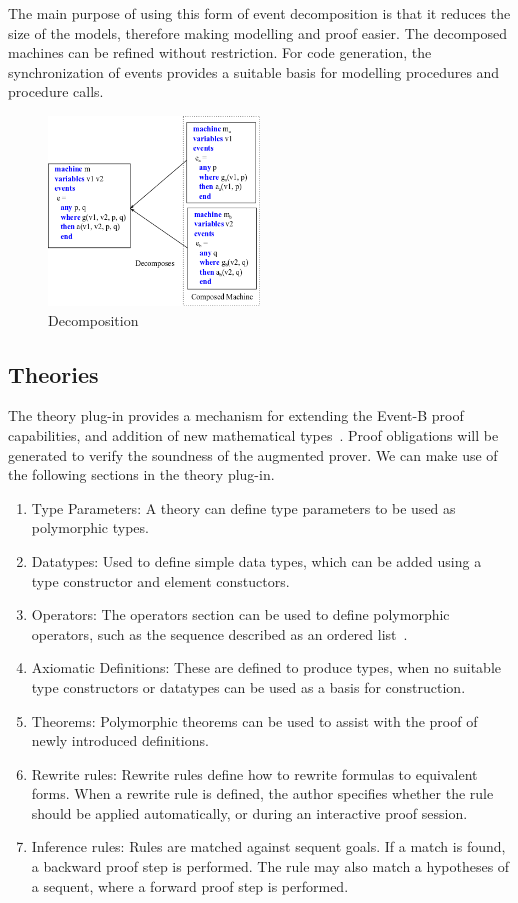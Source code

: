 The main purpose of using this form of event decomposition is that it reduces the size of the models, therefore making modelling and proof easier. The decomposed machines can be refined without restriction. For code generation, the synchronization of events provides a suitable basis for modelling procedures and procedure calls.
\begin{figure}
\centering
\includegraphics[width=0.5\textwidth]{graphics/Decomp2.png}
\caption{Decomposition}
\label{fig:decomp2}
\end{figure}
%
\subsection{Theories}
The theory plug-in provides a mechanism for extending the Event-B proof capabilities, and addition of new mathematical types~\cite{issam2013}. Proof obligations will be generated to verify the soundness of the augmented prover. We can make use of the following sections in the theory plug-in.

\begin{enumerate}
\item Type Parameters: A theory can define type parameters to be used as polymorphic types.
\item Datatypes: Used to define simple data types, which can be added using a type constructor and element constuctors.
\item Operators: The operators section can be used to define polymorphic operators, such as the sequence described as an ordered list~\cite{issam2013}. 
\item Axiomatic Definitions: These are defined to produce types, when no suitable type constructors or datatypes can be used as a basis for construction.
\item Theorems: Polymorphic theorems can be used to assist with the proof of newly introduced definitions. 
\item Rewrite rules: Rewrite rules define how to rewrite formulas to equivalent forms. When a rewrite rule is defined, the author specifies whether the rule should be applied automatically, or during an interactive proof session.
\item Inference rules: Rules are matched against sequent goals. If a match is found, a backward proof step is performed. The rule may also match a hypotheses of a sequent, where a forward proof step is performed.
\end{enumerate}



